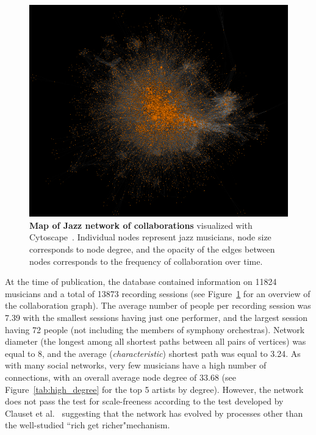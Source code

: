 \documentclass[12pt]{cmuthesis}
\begin{document}
  \begin{figure}[t]
    \centering
    \includegraphics[width=\linewidth]{figures/full_network_cropped.png}
    \caption{\textbf{Map of Jazz network of collaborations} visualized with Cytoscape~\cite{Cytoscape}. Individual nodes represent jazz musicians, node size corresponds to node degree, and the opacity of the edges between nodes corresponds to the frequency of collaboration over time.}
    \label{fig:moj:fullnetwork}
  \end{figure}



  At the time of publication, the database contained information on 11824 musicians and a total of 13873 recording sessions (see Figure~\ref{fig:moj:fullnetwork} for an overview of the collaboration graph). The average number of people per recording session was 7.39 with the smallest sessions having just one performer, and the largest session having 72 people (not including the members of symphony orchestras). Network diameter (the longest among all shortest paths between all pairs of vertices) was equal to 8, and the average (\emph{characteristic}) shortest path was equal to 3.24. As with many social networks, very few musicians have a high number of connections, with an overall average node degree of 33.68 (see Figure~\ref{tab:high_degree} for the top 5 artists by degree). However, the network does not pass the test for scale-freeness according to the test developed by Clauset et al.~\cite{Clauset2009b} suggesting that the network has evolved by processes other than the well-studied ``rich get richer"mechanism.
\end{document}
